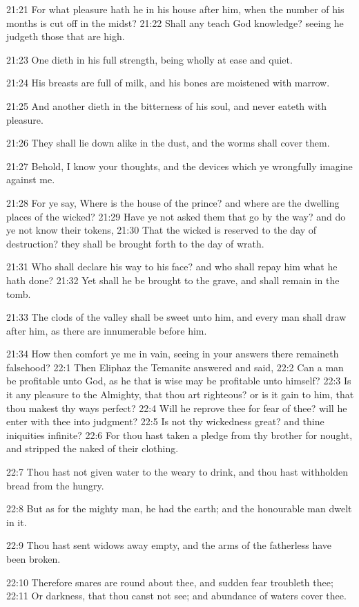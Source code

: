 21:21 For what pleasure hath he in his house after him, when the number of his months is cut off in the midst?  21:22 Shall any teach God knowledge? seeing he judgeth those that are high.

21:23 One dieth in his full strength, being wholly at ease and quiet.

21:24 His breasts are full of milk, and his bones are moistened with marrow.

21:25 And another dieth in the bitterness of his soul, and never eateth with pleasure.

21:26 They shall lie down alike in the dust, and the worms shall cover them.

21:27 Behold, I know your thoughts, and the devices which ye wrongfully imagine against me.

21:28 For ye say, Where is the house of the prince? and where are the dwelling places of the wicked?  21:29 Have ye not asked them that go by the way? and do ye not know their tokens, 21:30 That the wicked is reserved to the day of destruction? they shall be brought forth to the day of wrath.

21:31 Who shall declare his way to his face? and who shall repay him what he hath done?  21:32 Yet shall he be brought to the grave, and shall remain in the tomb.

21:33 The clods of the valley shall be sweet unto him, and every man shall draw after him, as there are innumerable before him.

21:34 How then comfort ye me in vain, seeing in your answers there remaineth falsehood?  22:1 Then Eliphaz the Temanite answered and said, 22:2 Can a man be profitable unto God, as he that is wise may be profitable unto himself?  22:3 Is it any pleasure to the Almighty, that thou art righteous? or is it gain to him, that thou makest thy ways perfect?  22:4 Will he reprove thee for fear of thee? will he enter with thee into judgment?  22:5 Is not thy wickedness great? and thine iniquities infinite?  22:6 For thou hast taken a pledge from thy brother for nought, and stripped the naked of their clothing.

22:7 Thou hast not given water to the weary to drink, and thou hast withholden bread from the hungry.

22:8 But as for the mighty man, he had the earth; and the honourable man dwelt in it.

22:9 Thou hast sent widows away empty, and the arms of the fatherless have been broken.

22:10 Therefore snares are round about thee, and sudden fear troubleth thee; 22:11 Or darkness, that thou canst not see; and abundance of waters cover thee.

